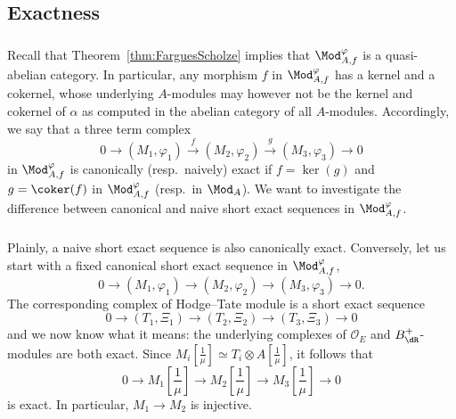 \subsection{Exactness}\label{subsec:Exactness}

\subsubsection{}

Recall that Theorem~\ref{thm:FarguesScholze} implies that $\Mod_{A,f}^{\varphi}$ is a quasi-abelian category. In particular, any morphism $f$ in $\Mod_{A,f}^{\varphi}$ has a kernel and a cokernel, whose underlying $A$-modules may however not be the kernel and cokernel of $\alpha$ as computed in the abelian category of all $A$-modules. Accordingly, we say that a three term complex
\[
0\rightarrow(M_{1},\varphi_{1})\stackrel{f}{\longrightarrow}(M_{2},\varphi_{2})\stackrel{g}{\longrightarrow}(M_{3},\varphi_{3})\rightarrow0
\]
in $\Mod_{A,f}^{\varphi}$ is canonically (resp.~naively) exact if $f=\ker(g)$ and $g=\coker(f)$ in $\Mod_{A,f}^{\varphi}$ (resp.~in $\Mod_{A}$). We want to investigate the difference between canonical and naive short exact sequences in $\Mod_{A,f}^{\varphi}$.

\subsubsection{}

Plainly, a naive short exact sequence is also canonically exact. Conversely, let us start with a fixed canonical short exact sequence in $\Mod_{A,f}^{\varphi}$,
\[
0\rightarrow(M_{1},\varphi_{1})\rightarrow(M_{2},\varphi_{2})\rightarrow(M_{3},\varphi_{3})\rightarrow0.
\]
The corresponding complex of Hodge--Tate module is a short exact sequence
\[
0\rightarrow(T_{1},\Xi_{1})\rightarrow(T_{2},\Xi_{2})\rightarrow(T_{3},\Xi_{3})\rightarrow0
\]
and we now know what it means: the underlying complexes of $\mathcal{O}_{E}$ and $B_{\dR}^{+}$-modules are both exact. Since $M_{i}[\frac{1}{\mu}]\simeq T_{i}\otimes A[\frac{1}{\mu}]$, it follows that
\[
0\rightarrow M_{1}\!\left[{\frac{1}{\mu}}\right]\rightarrow M_{2}\!\left[{\frac{1}{\mu}}\right]\rightarrow M_{3}\!\left[{\frac{1}{\mu}}\right]\rightarrow0
\]
is exact. In particular, $M_{1}\rightarrow M_{2}$ is injective.

\subsubsection{}

